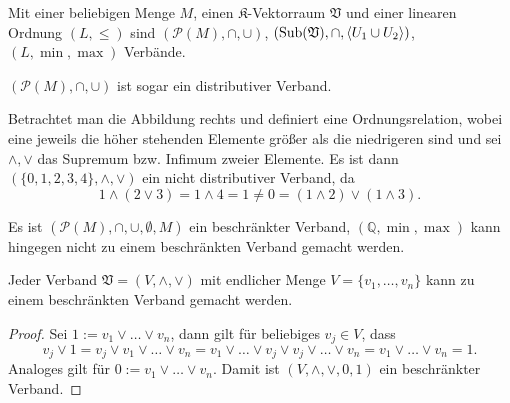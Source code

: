 \begin{example}
    Mit einer beliebigen Menge $M$, einen $\mathfrak{K}$-Vektorraum $\mathfrak{V}$ und einer linearen Ordnung $(L, \le)$ sind $(\mathcal{P}(M), \cap, \cup)$, $(\operatorname{Sub}(\mathfrak{V}), \cap, \langle U_1 \cup U_2 \rangle)$, $(L, \min, \max)$ Verbände.

    $(\mathcal{P}(M), \cap, \cup)$ ist sogar ein distributiver Verband.

    \begin{minipage}{0.56\textwidth}
        Betrachtet man die Abbildung rechts und definiert eine Ordnungsrelation, wobei eine jeweils die höher stehenden Elemente größer als die niedrigeren sind und sei $\wedge, \vee$ das Supremum bzw. Infimum zweier Elemente. Es ist dann $(\{0,1,2,3,4\}, \wedge, \vee)$ ein nicht distributiver Verband, da
        $$ 1 \wedge (2 \vee 3) = 1 \wedge 4 = 1 \neq 0 = (1 \wedge 2) \vee ( 1 \wedge 3). $$
    \end{minipage}
    \hspace{0.02\textwidth}
    \begin{minipage}{0.4\textwidth}
        \centering
    \end{minipage}

    Es ist $(\mathcal{P}(M), \cap, \cup, \emptyset, M)$ ein beschränkter Verband, $(\mathbb{Q}, \min, \max)$ kann hingegen nicht zu einem beschränkten Verband gemacht werden.
\end{example}

\begin{lemma}
    Jeder Verband $\mathfrak{V} = (V, \wedge, \vee)$ mit endlicher Menge $V = \{v_1, \ldots, v_n\}$ kann zu einem beschränkten Verband gemacht werden.
\end{lemma}
\begin{proof}
    Sei $1 := v_1 \vee \ldots \vee v_n$, dann gilt für beliebiges $v_j \in V$, dass $$v_j \vee 1 = v_j \vee v_1 \vee \ldots \vee v_n =  v_1 \vee \ldots \vee v_j \vee v_j \vee \ldots \vee v_n = v_1 \vee \ldots \vee v_n = 1.$$
    Analoges gilt für $0 := v_1 \vee \ldots \vee v_n$. Damit ist $(V, \wedge, \vee, 0, 1)$ ein beschränkter Verband. 
\end{proof}


